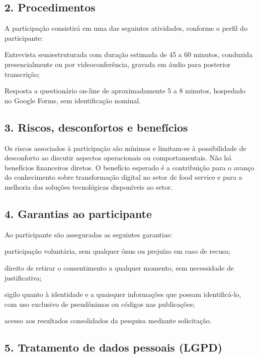 \subsection*{2. Procedimentos}

A participação consistirá em uma das seguintes atividades, conforme o perfil do participante:
\begin{alineas}
	\item Entrevista semiestruturada com duração estimada de 45 a 60 minutos, conduzida presencialmente ou por videoconferência, gravada em áudio para posterior transcrição;
	\item Resposta a questionário on-line de aproximadamente 5 a 8 minutos, hospedado no Google Forms, sem identificação nominal.
\end{alineas}

\subsection*{3. Riscos, desconfortos e benefícios}

Os riscos associados à participação são mínimos e limitam-se à possibilidade de desconforto ao discutir aspectos operacionais ou comportamentais. Não há benefícios financeiros diretos. O benefício esperado é a contribuição para o avanço do conhecimento sobre transformação digital no setor de food service e para a melhoria das soluções tecnológicas disponíveis ao setor.

\subsection*{4. Garantias ao participante}

Ao participante são asseguradas as seguintes garantias:
\begin{alineas}
	\item participação voluntária, sem qualquer ônus ou prejuízo em caso de recusa;
	\item direito de retirar o consentimento a qualquer momento, sem necessidade de justificativa;
	\item sigilo quanto à identidade e a quaisquer informações que possam identificá-lo, com uso exclusivo de pseudônimos ou códigos nas publicações;
	\item acesso aos resultados consolidados da pesquisa mediante solicitação.
\end{alineas}

\subsection*{5. Tratamento de dados pessoais (LGPD)}

